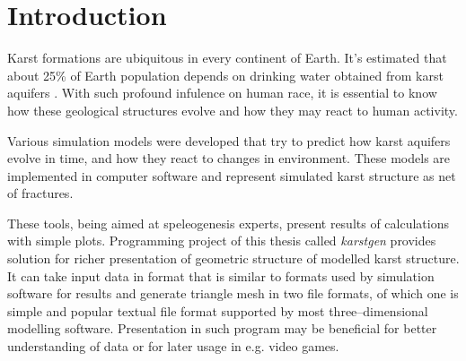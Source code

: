 \chapter{Introduction}

%




Karst formations are ubiquitous in every continent of Earth. It's estimated that
about 25\% of Earth population depends on drinking water obtained from karst
aquifers \parencite{ford2007karst}. With such profound infulence on human race,
it is essential to know how these geological structures evolve and how they may
react to human activity.

Various simulation models were developed that try to predict how karst aquifers
evolve in time, and how they react to changes in environment. These models are
implemented in computer software and represent simulated karst structure as
net of fractures.

These tools, being aimed at speleogenesis experts, present results of
calculations with simple plots. Programming project of this thesis called \emph{karstgen} provides
solution for richer presentation of geometric structure of modelled karst
structure. It can take input data in format that is similar to formats used by
simulation software for results and generate triangle mesh in two file formats,
of which one is simple and popular textual file format supported by most
three--dimensional modelling software. Presentation in such program may be
beneficial for better understanding of data or for later usage in e.g. video
games.

